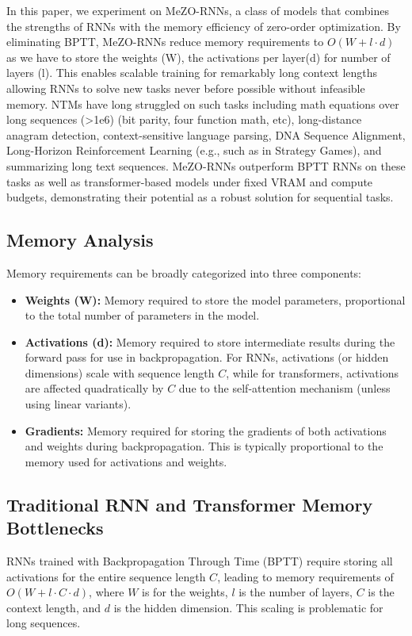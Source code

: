 \documentclass{article}
\begin{document}
In this paper, we experiment on MeZO-RNNs, a class of models that combines the strengths of RNNs with the memory efficiency of zero-order optimization. By eliminating BPTT, MeZO-RNNs reduce memory requirements to $O(W+l \cdot d)$ as we have to store the weights (W), the activations per layer(d) for number of layers (l). This enables scalable training for remarkably long context lengths allowing RNNs to solve  new tasks never before possible without infeasible memory. NTMs have long struggled on such tasks including math equations over long sequences (>1e6) (bit parity, four function math, etc), long-distance anagram detection, context-sensitive language parsing, DNA Sequence Alignment, Long-Horizon Reinforcement Learning (e.g., such as in Strategy Games), and summarizing long text sequences. MeZO-RNNs outperform BPTT RNNs on these tasks as well as transformer-based models under fixed VRAM and compute budgets, demonstrating their potential as a robust solution for sequential tasks.


\subsection{Memory Analysis}
Memory requirements can be broadly categorized into three components:
\begin{itemize}
    \item \textbf{Weights (W):} Memory required to store the model parameters, proportional to the total number of parameters in the model.
    \item \textbf{Activations (d):} Memory required to store intermediate results during the forward pass for use in backpropagation. For RNNs, activations (or hidden dimensions) scale with sequence length $C$, while for transformers, activations are affected quadratically by $C$ due to the self-attention mechanism (unless using linear variants).
    \item \textbf{Gradients:} Memory required for storing the gradients of both activations and weights during backpropagation. This is typically proportional to the memory used for activations and weights.
\end{itemize}

\subsection{Traditional RNN and Transformer Memory Bottlenecks}
RNNs trained with Backpropagation Through Time (BPTT) require storing all activations for the entire sequence length $C$, leading to memory requirements of $O(W + l \cdot C \cdot d)$, where $W$ is for the weights, $l$ is the number of layers, $C$ is the context length, and $d$ is the hidden dimension. This scaling is problematic for long sequences.
\end{document}
